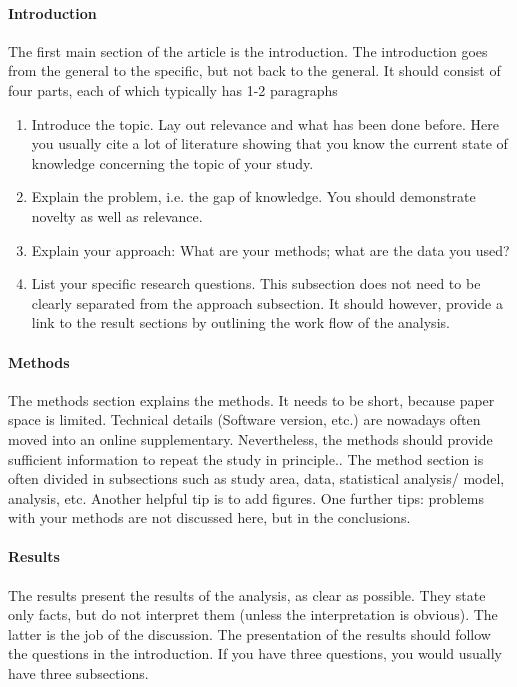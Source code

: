 \documentclass{tufte-book}
\begin{document}
\paragraph{Introduction} The first main section of the article is the introduction. The introduction goes from the general to the specific, but not back to the general. It should consist of four parts, each of which typically has 1-2 paragraphs

\begin{enumerate}
\item Introduce the topic. Lay out relevance and what has been done before. Here you usually cite a lot of literature showing that you know the current state of knowledge concerning the topic of your study.
\item Explain the problem, i.e. the gap of knowledge. You should demonstrate novelty as well as relevance.
\item Explain your approach: What are your methods; what are the data you used?
\item List your specific research questions. This subsection does not need to be clearly separated from the approach subsection. It should however, provide a link to the result sections by outlining the work flow of the analysis.
\end{enumerate}

\paragraph{Methods} The methods section explains the methods. It needs to be short, because paper space is limited. Technical details (Software version, etc.) are nowadays often moved into an online supplementary. Nevertheless, the methods should provide sufficient information to repeat the study in principle.. The method section is often divided in subsections such as study area, data, statistical analysis/ model, analysis, etc. Another helpful tip is to add figures. One further tips: problems with your methods are not discussed here, but in the conclusions. 


\paragraph{Results} The results present the results of the analysis, as clear as possible. They state only facts, but do not interpret them (unless the interpretation is obvious). The latter is the job of the discussion. The presentation of the results should follow the questions in the introduction. If you have three questions, you would usually have three subsections. 
\end{document}
